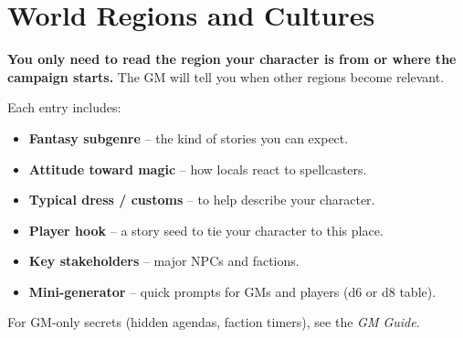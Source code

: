 \chapter{World Regions and Cultures}
\label{ch:world-cultures}

\begin{tcolorbox}[colback=blue!5!white, colframe=blue!75!black, title=Using This Compendium,breakable]
\textbf{You only need to read the region your character is from or where the campaign starts.} The GM will tell you when other regions become relevant.

\medskip
\noindent Each entry includes:
\begin{itemize}
  \item \textbf{Fantasy subgenre} -- the kind of stories you can expect.
  \item \textbf{Attitude toward magic} -- how locals react to spellcasters.
  \item \textbf{Typical dress / customs} -- to help describe your character.
  \item \textbf{Player hook} -- a story seed to tie your character to this place.
  \item \textbf{Key stakeholders} -- major NPCs and factions.
  \item \textbf{Mini-generator} -- quick prompts for GMs and players (d6 or d8 table).
\end{itemize}
For GM-only secrets (hidden agendas, faction timers), see the \textit{GM Guide}.
\end{tcolorbox}

